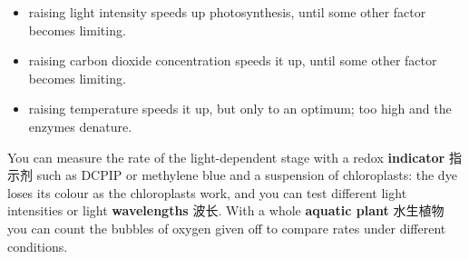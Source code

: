\documentclass[11pt]{article}
\begin{document}
\begin{itemize}
\item raising light intensity speeds up photosynthesis, until some other factor becomes limiting.

\item raising carbon dioxide concentration speeds it up, until some other factor becomes limiting.

\item raising temperature speeds it up, but only to an optimum; too high and the enzymes denature.

\end{itemize}

You can measure the rate of the light-dependent stage with a redox \textbf{indicator} 指示剂 such as DCPIP or methylene blue and a suspension of chloroplasts: the dye loses its colour as the chloroplasts work, and you can test different light intensities or light \textbf{wavelengths} 波长. With a whole \textbf{aquatic plant} 水生植物 you can count the bubbles of oxygen given off to compare rates under different conditions.
\end{document}
